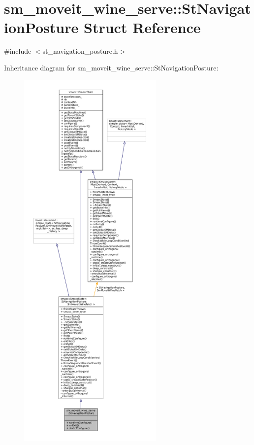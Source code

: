 \hypertarget{structsm__moveit__wine__serve_1_1StNavigationPosture}{}\section{sm\+\_\+moveit\+\_\+wine\+\_\+serve\+:\+:St\+Navigation\+Posture Struct Reference}
\label{structsm__moveit__wine__serve_1_1StNavigationPosture}


{\ttfamily \#include $<$st\+\_\+navigation\+\_\+posture.\+h$>$}



Inheritance diagram for sm\+\_\+moveit\+\_\+wine\+\_\+serve\+:\+:St\+Navigation\+Posture\+:
\nopagebreak
\begin{figure}[H]
\begin{center}
\leavevmode
\includegraphics[height=550pt]{structsm__moveit__wine__serve_1_1StNavigationPosture__inherit__graph}
\end{center}
\end{figure}


